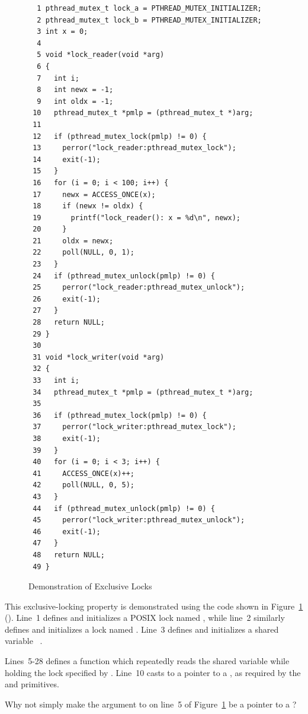 \begin{figure}[tbp]
{ \scriptsize
\begin{verbatim}
  1 pthread_mutex_t lock_a = PTHREAD_MUTEX_INITIALIZER;
  2 pthread_mutex_t lock_b = PTHREAD_MUTEX_INITIALIZER;
  3 int x = 0;
  4 
  5 void *lock_reader(void *arg)
  6 {
  7   int i;
  8   int newx = -1;
  9   int oldx = -1;
 10   pthread_mutex_t *pmlp = (pthread_mutex_t *)arg;
 11 
 12   if (pthread_mutex_lock(pmlp) != 0) {
 13     perror("lock_reader:pthread_mutex_lock");
 14     exit(-1);
 15   }
 16   for (i = 0; i < 100; i++) {
 17     newx = ACCESS_ONCE(x);
 18     if (newx != oldx) {
 19       printf("lock_reader(): x = %d\n", newx);
 20     }
 21     oldx = newx;
 22     poll(NULL, 0, 1);
 23   }
 24   if (pthread_mutex_unlock(pmlp) != 0) {
 25     perror("lock_reader:pthread_mutex_unlock");
 26     exit(-1);
 27   }
 28   return NULL;
 29 }
 30 
 31 void *lock_writer(void *arg)
 32 {
 33   int i;
 34   pthread_mutex_t *pmlp = (pthread_mutex_t *)arg;
 35 
 36   if (pthread_mutex_lock(pmlp) != 0) {
 37     perror("lock_writer:pthread_mutex_lock");
 38     exit(-1);
 39   }
 40   for (i = 0; i < 3; i++) {
 41     ACCESS_ONCE(x)++;
 42     poll(NULL, 0, 5);
 43   }
 44   if (pthread_mutex_unlock(pmlp) != 0) {
 45     perror("lock_writer:pthread_mutex_unlock");
 46     exit(-1);
 47   }
 48   return NULL;
 49 }
\end{verbatim}
}
\caption{Demonstration of Exclusive Locks}
\label{fig:toolsoftrade:Demonstration of Exclusive Locks}
\end{figure}

This exclusive-locking property is demonstrated using the code shown in
Figure~\ref{fig:toolsoftrade:Demonstration of Exclusive Locks}
().
Line~1 defines and initializes a POSIX lock named , while
line~2 similarly defines and initializes a lock named .
Line~3 defines and initializes a shared variable ~.

Lines~5-28 defines a function  which repeatedly
reads the shared variable  while holding
the lock specified by .
Line~10 casts  to a pointer to a , as
required by the  and 
primitives.

\QuickQuiz{}
	Why not simply make the argument to 
	on line~5 of
	Figure~\ref{fig:toolsoftrade:Demonstration of Exclusive Locks}
	be a pointer to a ?
 \QuickQuizEnd

